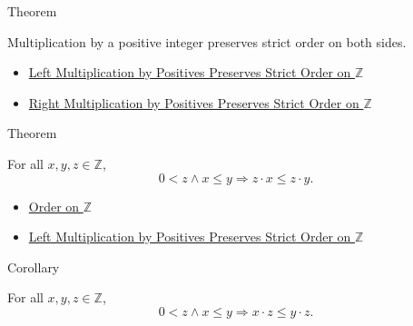 \begin{theorembox}{Theorem}
\begin{theorem}
\label{thm:positive-multiplication-preserves-strict-order-on-z}
Multiplication by a positive integer preserves strict order on both sides.
\end{theorem}
\end{theorembox}

\begin{dependencies}
\begin{itemize}
  \item \hyperref[thm:left-positive-multiplication-preserves-strict-order-on-z]{Left Multiplication by Positives Preserves Strict Order on $\mathbb{Z}$}
  \item \hyperref[cor:right-positive-multiplication-preserves-strict-order-on-z]{Right Multiplication by Positives Preserves Strict Order on $\mathbb{Z}$}
\end{itemize}
\end{dependencies}

\begin{theorembox}{Theorem}
\begin{theorem}
\label{thm:left-positive-multiplication-preserves-order-on-z}
For all $x,y,z\in\mathbb{Z}$,
\[
0<z\land x\le y \Longrightarrow z\cdot x\le z\cdot y.
\]
\end{theorem}
\end{theorembox}

\begin{dependencies}
\begin{itemize}
  \item \hyperref[def:order-on-z]{Order on $\mathbb{Z}$}
  \item \hyperref[thm:left-positive-multiplication-preserves-strict-order-on-z]{Left Multiplication by Positives Preserves Strict Order on $\mathbb{Z}$}
\end{itemize}
\end{dependencies}

\begin{corollarybox}{Corollary}
\begin{corollary}
\label{cor:right-positive-multiplication-preserves-order-on-z}
For all $x,y,z\in\mathbb{Z}$,
\[
0<z\land x\le y \Longrightarrow x\cdot z\le y\cdot z.
\]
\end{corollary}
\end{corollarybox}

